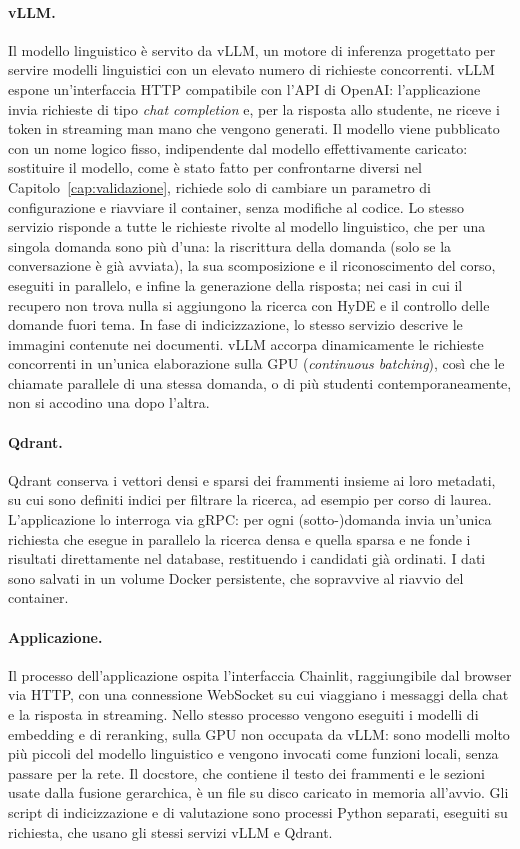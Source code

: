 \paragraph{vLLM.} Il modello linguistico è servito da vLLM, un motore di inferenza progettato per servire modelli
linguistici con un elevato numero di richieste concorrenti. vLLM espone un'interfaccia HTTP compatibile con l'API
di OpenAI: l'applicazione invia richieste di tipo \emph{chat completion} e, per la risposta allo studente, ne
riceve i token in streaming man mano che vengono generati. Il modello viene pubblicato con un nome logico fisso,
indipendente dal modello effettivamente caricato: sostituire il modello, come è stato fatto per confrontarne
diversi nel Capitolo~\ref{cap:validazione}, richiede solo di cambiare un parametro di configurazione e riavviare il
container, senza modifiche al codice. Lo stesso servizio risponde a tutte le richieste rivolte al modello
linguistico, che per una singola domanda sono più d'una: la riscrittura della domanda (solo se la conversazione è
già avviata), la sua scomposizione e il riconoscimento del corso, eseguiti in parallelo, e infine la generazione
della risposta; nei casi in cui il recupero non trova nulla si aggiungono la ricerca con HyDE e il controllo delle
domande fuori tema. In fase di indicizzazione, lo stesso servizio descrive le immagini contenute nei documenti.
vLLM accorpa dinamicamente le richieste concorrenti in un'unica elaborazione sulla GPU (\emph{continuous
batching}), così che le chiamate parallele di una stessa domanda, o di più studenti contemporaneamente, non si
accodino una dopo l'altra.

\paragraph{Qdrant.} Qdrant conserva i vettori densi e sparsi dei frammenti insieme ai loro metadati, su cui sono
definiti indici per filtrare la ricerca, ad esempio per corso di laurea. L'applicazione lo interroga via gRPC: per
ogni (sotto-)domanda invia un'unica richiesta che esegue in parallelo la ricerca densa e quella sparsa e ne fonde i
risultati direttamente nel database, restituendo i candidati già ordinati. I dati sono salvati in un volume Docker
persistente, che sopravvive al riavvio del container.

\paragraph{Applicazione.} Il processo dell'applicazione ospita l'interfaccia Chainlit, raggiungibile dal browser
via HTTP, con una connessione WebSocket su cui viaggiano i messaggi della chat e la risposta in streaming. Nello
stesso processo vengono eseguiti i modelli di embedding e di reranking, sulla GPU non occupata da vLLM: sono modelli
molto più piccoli del modello linguistico e vengono invocati come funzioni locali, senza passare per la rete. Il
docstore, che contiene il testo dei frammenti e le sezioni usate dalla fusione gerarchica, è un file su disco
caricato in memoria all'avvio. Gli script di indicizzazione e di valutazione sono processi Python separati, eseguiti
su richiesta, che usano gli stessi servizi vLLM e Qdrant.

